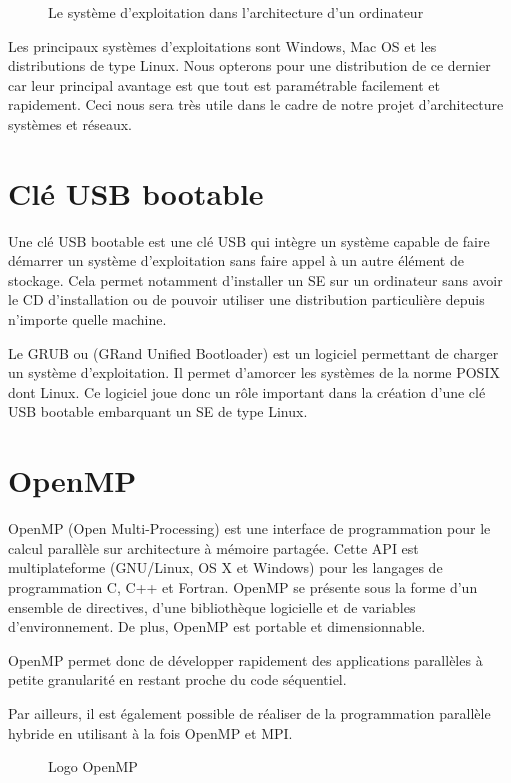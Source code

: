 \documentclass[final]{polytech/polytech}
\begin{document}
\begin{figure}
	\caption{Le système d'exploitation dans l'architecture d'un ordinateur}
	\label{fig:se_architecture}
\end{figure}

Les principaux systèmes d'exploitations sont Windows, Mac OS et les distributions de type Linux. Nous opterons pour une distribution de ce dernier car leur principal avantage est que tout est paramétrable facilement et rapidement. Ceci nous sera très utile dans le cadre de notre projet d'architecture systèmes et réseaux.

\section{Clé USB bootable}
Une clé USB bootable est une clé USB qui intègre un système capable de faire démarrer un système d'exploitation sans faire appel à un autre élément de stockage. Cela permet notamment d'installer un SE sur un ordinateur sans avoir le CD d'installation ou de pouvoir utiliser une distribution particulière depuis n'importe quelle machine.

Le GRUB ou (GRand Unified Bootloader) est un logiciel permettant de charger un système d'exploitation. Il permet d'amorcer les systèmes de la norme POSIX dont Linux. Ce logiciel joue donc un rôle important dans la création d'une clé USB bootable embarquant un SE de type Linux.

\section{OpenMP}
OpenMP (Open Multi-Processing) est une interface de programmation pour le calcul parallèle sur architecture à mémoire partagée. Cette API est multiplateforme (GNU/Linux, OS X et Windows) pour les langages de programmation C, C++ et Fortran. OpenMP se présente sous la forme d’un ensemble de directives, d’une bibliothèque logicielle et de variables d’environnement. De plus, OpenMP est portable et dimensionnable.

OpenMP permet donc de développer rapidement des applications parallèles à petite granularité en restant proche du code séquentiel.

Par ailleurs, il est également possible de réaliser de la programmation parallèle hybride en utilisant à la fois OpenMP et MPI.

\begin{figure}
	\caption{Logo OpenMP}
	\label{fig:logo_openmp}
\end{figure}
\end{document}
